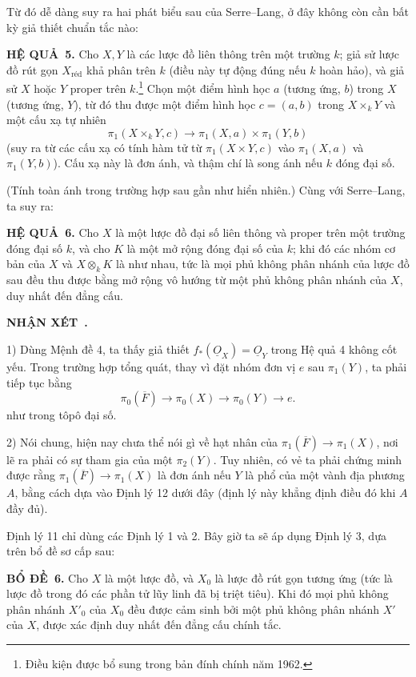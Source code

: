 \documentclass[11pt,twoside,openany]{book}
\numberwithin{equation}{section}
\newcommand{\src}[1]{%
  \phantomsection\hypertarget{src:\fgasourceid:#1}{}%
  \marginpar{\raggedleft\footnotesize\sffamily #1}%
}
\newcommand{\fgasourceid}{unset}
\newcommand{\Osh}{\underline{O}}
\newcommand{\result}[2]{\par\medskip\noindent\textbf{#1\if\relax\detokenize{#2}\relax\else\ #2\fi.}\quad}
\begin{document}
Từ đó dễ dàng suy ra hai phát biểu sau của Serre--Lang, ở đây không còn cần
bất kỳ giả thiết chuẩn tắc nào:

\result{HỆ QUẢ}{5} Cho $X,Y$ là các lược đồ liên thông trên một trường $k$;
giả sử lược đồ rút gọn $X_{\mathrm{réd}}$ khả phân trên $k$ (điều này tự động
đúng nếu $k$ hoàn hảo), và giả sử $X$ hoặc $Y$ proper trên
$k$.\footnote{Điều kiện được bổ sung trong bản đính chính năm 1962.} Chọn một
điểm hình học $a$ (tương ứng, $b$) trong $X$ (tương ứng, $Y$), từ đó thu được
một điểm hình học $c=(a,b)$ trong $X\times_kY$ và một cấu xạ tự nhiên
\[
  \pi_1(X\times_kY,c)\longrightarrow
  \pi_1(X,a)\times\pi_1(Y,b)
\]
(suy ra từ các cấu xạ có tính hàm tử từ $\pi_1(X\times Y,c)$ vào
$\pi_1(X,a)$ và $\pi_1(Y,b)$). Cấu xạ này là đơn ánh, và thậm chí là song ánh
nếu $k$ đóng đại số.

(Tính toàn ánh trong trường hợp sau gần như hiển nhiên.) Cùng với Serre--Lang,
ta suy ra:

\result{HỆ QUẢ}{6} Cho $X$ là một lược đồ đại số liên thông và proper trên
một trường đóng đại số $k$, và cho $K$ là một mở rộng đóng đại số của $k$;
khi đó các nhóm cơ bản của $X$ và $X\otimes_kK$ là như nhau, tức là mọi phủ
không phân nhánh của lược đồ sau đều thu được bằng mở rộng vô hướng từ một phủ
không phân nhánh của $X$, duy nhất đến đẳng cấu.

\result{NHẬN XÉT}{}

1) Dùng Mệnh đề 4, ta thấy giả thiết $f_*(\Osh_X)=\Osh_Y$ trong Hệ quả 4 không
cốt yếu. Trong trường hợp tổng quát, thay vì đặt nhóm đơn vị $e$ sau
$\pi_1(Y)$, ta phải tiếp tục bằng
\[
  \pi_0(\overline F)\longrightarrow\pi_0(X)
  \longrightarrow\pi_0(Y)\longrightarrow e.
\]
như trong tôpô đại số.

\src{216}
2) Nói chung, hiện nay chưa thể nói gì về hạt nhân của
$\pi_1(\overline F)\longrightarrow\pi_1(X)$, nơi lẽ ra phải có sự tham gia của
một $\pi_2(Y)$. Tuy nhiên, có vẻ ta phải chứng minh được rằng
$\pi_1(\overline F)\longrightarrow\pi_1(X)$ là đơn ánh nếu $Y$ là phổ của một
vành địa phương $A$, bằng cách dựa vào Định lý 12 dưới đây (định lý này khẳng
định điều đó khi $A$ đầy đủ).

Định lý 11 chỉ dùng các Định lý 1 và 2. Bây giờ ta sẽ áp dụng Định lý 3, dựa
trên bổ đề sơ cấp sau:

\result{BỔ ĐỀ}{6} Cho $X$ là một lược đồ, và $X_0$ là lược đồ rút gọn tương
ứng (tức là lược đồ trong đó các phần tử lũy linh đã bị triệt tiêu). Khi đó mọi
phủ không phân nhánh $X'_0$ của $X_0$ đều được cảm sinh bởi một phủ không phân
nhánh $X'$ của $X$, được xác định duy nhất đến đẳng cấu chính tắc.
\end{document}
